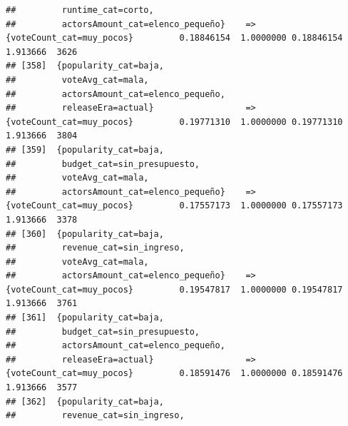 \documentclass[
]{article}
\begin{document}
\begin{verbatim}
##         runtime_cat=corto,                                                                                                      
##         actorsAmount_cat=elenco_pequeño}    => {voteCount_cat=muy_pocos}         0.18846154  1.0000000 0.18846154 1.913666  3626
## [358]  {popularity_cat=baja,                                                                                                    
##         voteAvg_cat=mala,                                                                                                       
##         actorsAmount_cat=elenco_pequeño,                                                                                        
##         releaseEra=actual}                  => {voteCount_cat=muy_pocos}         0.19771310  1.0000000 0.19771310 1.913666  3804
## [359]  {popularity_cat=baja,                                                                                                    
##         budget_cat=sin_presupuesto,                                                                                             
##         voteAvg_cat=mala,                                                                                                       
##         actorsAmount_cat=elenco_pequeño}    => {voteCount_cat=muy_pocos}         0.17557173  1.0000000 0.17557173 1.913666  3378
## [360]  {popularity_cat=baja,                                                                                                    
##         revenue_cat=sin_ingreso,                                                                                                
##         voteAvg_cat=mala,                                                                                                       
##         actorsAmount_cat=elenco_pequeño}    => {voteCount_cat=muy_pocos}         0.19547817  1.0000000 0.19547817 1.913666  3761
## [361]  {popularity_cat=baja,                                                                                                    
##         budget_cat=sin_presupuesto,                                                                                             
##         actorsAmount_cat=elenco_pequeño,                                                                                        
##         releaseEra=actual}                  => {voteCount_cat=muy_pocos}         0.18591476  1.0000000 0.18591476 1.913666  3577
## [362]  {popularity_cat=baja,                                                                                                    
##         revenue_cat=sin_ingreso,                                                                                                

\end{verbatim}
\end{document}
